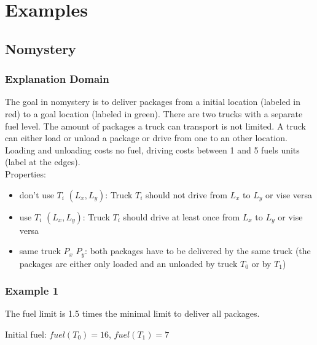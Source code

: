 \section{Examples}

\subsection{Nomystery}

\subsubsection*{Explanation Domain}
The goal in nomystery is to deliver packages from a initial location (labeled in red)
to a goal location (labeled in green). There are two trucks with a separate fuel level.
The amount of packages a truck can transport is not limited. A truck can either load or 
unload a package or drive from one to an other location. Loading and unloading costs no fuel,
driving costs between 1 and 5 fuels units (label at the edges).\\

Properties:
\begin{itemize}
	\item don't use $T_i$ $(L_x,L_y)$: Truck $T_i$ should not drive from $L_x$ to
		$L_y$ or vise versa
	\item use $T_i$ $(L_x,L_y)$: Truck $T_i$ should drive at least once from $L_x$ to
		$L_y$ or vise versa
	\item same truck $P_x$ $P_y$: both packages have to be delivered by the same truck
		(the packages are either only loaded and an unloaded by truck $T_0$ or by $T_1$)
\end{itemize}

\subsubsection*{Example 1}
	The fuel limit is 1.5 times the minimal limit to deliver all packages.

	Initial fuel:
	$fuel(T_0) = 16$, $fuel(T_1) = 7$

